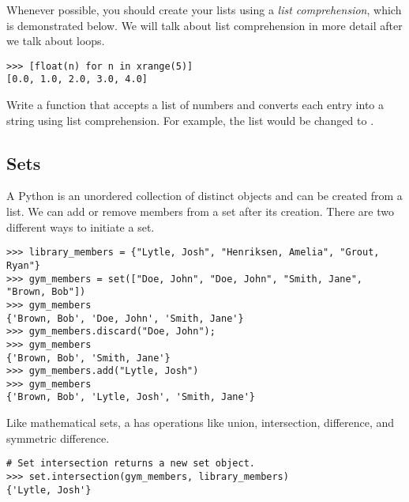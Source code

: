 Whenever possible, you should create your lists using a \emph{list comprehension}, which is demonstrated below.  We will talk about list comprehension in more detail after we talk about  loops.
\begin{lstlisting}
>>> [float(n) for n in xrange(5)]
[0.0, 1.0, 2.0, 3.0, 4.0]
\end{lstlisting}

\begin{problem}
Write a function that accepts a list of numbers and converts each entry into a string using list comprehension.  For example, the list \li{[1, 2, 3]} would be changed to \li{["1", "2", "3"]}.
\end{problem}



\subsection*{Sets}
A Python  is an unordered collection of distinct objects and can be created from a list. We can add or remove members from a set after its creation. There are two different ways to initiate a set.
\begin{lstlisting}
>>> library_members = {"Lytle, Josh", "Henriksen, Amelia", "Grout, Ryan"}
>>> gym_members = set(["Doe, John", "Doe, John", "Smith, Jane", "Brown, Bob"])
>>> gym_members
{'Brown, Bob', 'Doe, John', 'Smith, Jane'}
>>> gym_members.discard("Doe, John");
>>> gym_members
{'Brown, Bob', 'Smith, Jane'}
>>> gym_members.add("Lytle, Josh")
>>> gym_members
{'Brown, Bob', 'Lytle, Josh', 'Smith, Jane'}
\end{lstlisting}

Like mathematical sets, a  has operations like union, intersection, 
difference, and symmetric difference.
\begin{lstlisting}
# Set intersection returns a new set object.
>>> set.intersection(gym_members, library_members)
{'Lytle, Josh'}
\end{lstlisting}

